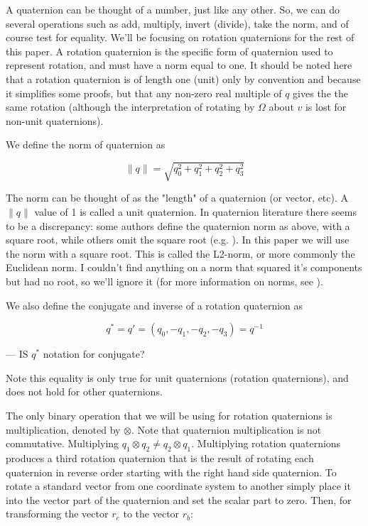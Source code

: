 \documentclass{article}
\numberwithin{equation}{section} %
\begin{document}
A quaternion can be thought of a number, just like any other. So, we can do several operations such as add, multiply, invert (divide), take the norm, and of course test for equality. We'll be focusing on rotation quaternions for the rest of this paper. A rotation quaternion is the specific form of quaternion used to represent rotation, and must have a norm equal to one. It should be noted here that a rotation quaternion is of length one (unit) only by convention and because it simplifies some proofs, but that any non-zero real multiple of $q$ gives the the same rotation (although the interpretation of rotating by $\Omega$ about $v$ is lost for non-unit quaternions).

We define the norm of quaternion as

$$ \lVert q \rVert = \sqrt{q_0^2 + q_1^2 + q_2^2 + q_3^2} $$

The norm can be thought of as the "length" of a quaternion (or vector, etc). A $ \lVert q \rVert $ value of 1 is called a unit quaternion. In quaternion literature there seems to be a discrepancy: some authors define the quaternion norm as above, with a square root, while others omit the square root (e.g. \cite{shoemake69}). In this paper we will use the norm with a square root. This is called the L2-norm, or more commonly the Euclidean norm. I couldn't find anything on a norm that squared it's components but had no root, so we'll ignore it (for more information on norms, see \cite{malek09}).

We also define the conjugate and inverse of a rotation quaternion as

$$ q^* = q' = \left(q_0, -q_1, -q_2, -q_3 \right) = q^{-1} $$

--- IS $q^*$ notation for conjugate?

Note this equality is only true for unit quaternions (rotation quaternions), and does not hold for other quaternions.

The only binary operation that we will be using for rotation quaternions is multiplication, denoted by $ \otimes$. Note that quaternion multiplication is not commutative. Multiplying $q_1 \otimes q_2 \neq q_2 \otimes q_1 $. Multiplying rotation quaternions produces a third rotation quaternion that is the result of rotating each quaternion in reverse order starting with the right hand side quaternion. To rotate a standard vector from one coordinate system to another simply place it into the vector part of the quaternion and set the scalar part to zero. Then, for transforming the vector $r_e$ to the vector $r_b$:
\end{document}
